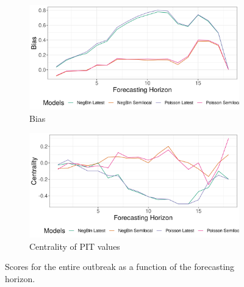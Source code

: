 \begin{figure}[H]
\begin{subfigure}{0.5\textwidth}
  \centering
  \includegraphics[width=\linewidth]{../output/Mwenga_bias.png}  
  \caption{Bias}
  \label{fig:sub-third}
\end{subfigure}
\begin{subfigure}{0.5\textwidth}
  \centering
  \includegraphics[width=\linewidth]{../output/Mwenga_centrality.png}  
  \caption{Centrality of PIT values}
  \label{fig:nat_scores_4}
\end{subfigure}
  \caption{Scores for the entire outbreak as a function of the forecasting horizon.}

  \label{fig:nat_scores}
\end{figure}

